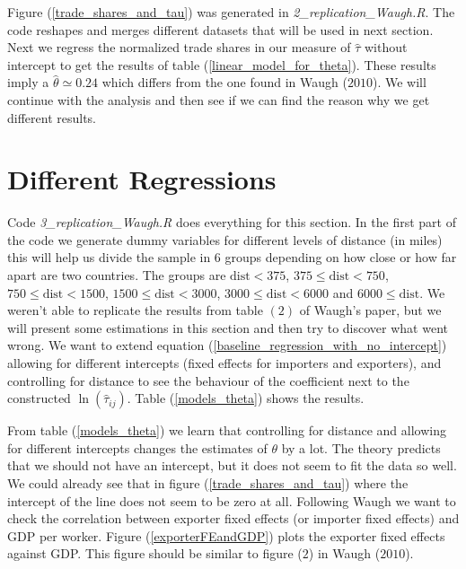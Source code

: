 \documentclass[a4paper,12pt]{article}
\begin{document}
 Figure (\ref{trade_shares_and_tau}) was generated in \textit{2\_replication\_Waugh.R}. The code reshapes and merges different datasets that will be used in next section. Next we regress the normalized trade shares in our measure of $\hat{\tau}$ without intercept to get the results of table (\ref{linear_model_for_theta}). These results imply a $\hat{\theta} \simeq 0.24$ which differs from the one found in Waugh ($2010$). We will continue with the analysis and then see if we can find the reason why we get different results. 
 
 \label{linear_model_for_theta}
 
 \section{Different Regressions} 
    
 Code \textit{3\_replication\_Waugh.R} does everything for this section. In the first part of the code we generate dummy variables for different levels of distance (in miles) this will help us divide the sample in $6$ groups depending on how close or how far apart are two countries. The groups are $\text{dist}<375$, $375\leq \text{dist} < 750$, $750\leq \text{dist} < 1500$, $1500\leq \text{dist} < 3000$, $3000\leq \text{dist} < 6000$ and $6000\leq \text{dist}$. We weren't able to replicate the results from table $(2)$ of Waugh's paper, but we will present some estimations in this section and then try to discover what went wrong. We want to extend equation (\ref{baseline_regression_with_no_intercept}) allowing for different intercepts (fixed effects for importers and exporters), and controlling for distance to see the behaviour of the coefficient next to the constructed $\ln(\hat{\tau}_{ij})$. Table (\ref{models_theta}) shows the results. 
 
 
 
 From table (\ref{models_theta}) we learn that controlling for distance and allowing for different intercepts changes the estimates of $\theta$ by a lot. The theory predicts that we should not have an intercept, but it does not seem to fit the data so well. We could already see that in figure (\ref{trade_shares_and_tau}) where the intercept of the line does not seem to be zero at all. Following Waugh we want to check the correlation between exporter fixed effects (or importer fixed effects) and GDP per worker. Figure (\ref{exporterFEandGDP}) plots the exporter fixed effects against GDP. This figure should be similar to figure ($2$) in Waugh ($2010$).  %
 
\end{document}
